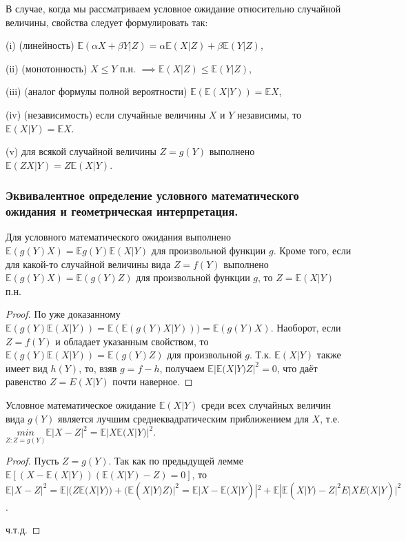 \begin{theorem}
	В случае, когда мы рассматриваем условное ожидание относительно случайной величины, свойства следует формулировать так:
	
	(i) (линейность) $\mathbb{E}(\alpha X + \beta Y |Z) = \alpha\mathbb{E}(X|Z) + \beta\mathbb{E}(Y | Z)$,
	
	(ii) (монотонность) $X \leqslant Y$ п.н. $\implies \mathbb{E}(X|Z) \leqslant \mathbb{E}(Y|Z)$,
	
	(iii) (аналог формулы полной вероятности) $\mathbb{E}(\mathbb{E}(X|Y)) = \mathbb{E}X$,
	
	(iv) (независимость) если случайные величины $X$ и $Y$ независимы, то $\mathbb{E}(X|Y) = \mathbb{E}X$.
	
	(v) для всякой случайной величины $Z = g(Y)$ выполнено $\mathbb{E}(ZX|Y ) = Z\mathbb{E}(X|Y )$.
\end{theorem}

\subsubsection{Эквивалентное определение условного математического ожидания и геометрическая интерпретация.}

Для условного математического ожидания выполнено $\mathbb{E}(g(Y)X) = \mathbb{E}g(Y)\mathbb{E}(X|Y)$ для произвольной функции $g$. Кроме того, если для какой-то случайной величины вида $Z = f(Y)$ выполнено $\mathbb{E}(g(Y)X) = \mathbb{E}(g(Y)Z)$ для произвольной функции $g$, то $Z = \mathbb{E}(X|Y)$ п.н.

\begin{proof} По уже доказанному $\mathbb{E}(g(Y)\mathbb{E}(X|Y))= \mathbb{E}(\mathbb{E}(g(Y)X|Y)))=\mathbb{E}(g(Y)X)$. Наоборот, если $Z = f(Y)$ и обладает указанным свойством, то $\mathbb{E}(g(Y)\mathbb{E}(X|Y))=\mathbb{E}(g(Y)Z)$ для произвольной $g$. Т.к. $\mathbb{E}(X|Y)$ также имеет вид $h(Y)$, то, взяв $g = f - h$, получаем $\mathbb{E}|\mathbb{E}(X|Y)Z|^2 = 0$, что даёт равенство $Z = E(X|Y)$ почти наверное.
\end{proof}

\begin{proposal}
	Условное математическое ожидание $\mathbb{E}(X|Y)$ среди всех случайных	величин вида $g(Y)$ является лучшим среднеквадратическим приближением для $X$, т.е. $\underset{Z:Z=g(Y )}{min}	\mathbb{E}|X-Z|^2 = \mathbb{E}|X\mathbb{E}(X|Y)|^2$.
\end{proposal}

\begin{proof}
	Пусть $Z = g(Y)$. Так как по предыдущей лемме $\mathbb{E}[(X - \mathbb{E}(X|Y))(\mathbb{E}(X|Y) - Z) = 0]$, то $\mathbb{E}|X - Z|^2 = \mathbb{E}|(Z\mathbb{E}(X|Y)) + (\mathbb{E}(X|Y)Z)|^2 = \mathbb{E}|X-\mathbb{E}(X|Y)|^2 + \mathbb{E}|\mathbb{E}(X|Y)-Z|^2 E|X E(X|Y)|^2$.
	
	ч.т.д.
\end{proof}

